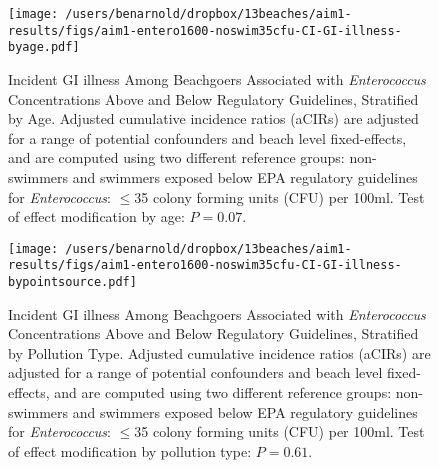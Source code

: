 \documentclass[12pt]{article}\usepackage[]{graphicx}\usepackage[]{color}
\begin{document}
\begin{landscape}
\begin{figure}[htbp]
\begin{center}
\texttt{[image: /users/benarnold/dropbox/13beaches/aim1-results/figs/aim1-entero1600-noswim35cfu-CI-GI-illness-byage.pdf]}
\begin{minipage}{1.2\textwidth}
\caption{Incident GI illness Among Beachgoers Associated with \textit{Enterococcus} Concentrations Above and Below Regulatory Guidelines, Stratified by Age. Adjusted cumulative incidence ratios (aCIRs) are adjusted for a range of potential confounders and beach level fixed-effects, and are computed using two different reference groups: non-swimmers and swimmers exposed below EPA regulatory guidelines for \textit{Enterococcus}: $\leq$35 colony forming units (CFU) per 100ml. Test of effect modification by age: $P=0.07$.}
\label{fig:GIentero35age}
\end{minipage}
\end{center}
\end{figure}
\end{landscape}

\begin{figure}[htbp]
\begin{center}
\texttt{[image: /users/benarnold/dropbox/13beaches/aim1-results/figs/aim1-entero1600-noswim35cfu-CI-GI-illness-bypointsource.pdf]}
\begin{minipage}{1\textwidth}
\caption{Incident GI illness Among Beachgoers Associated with \textit{Enterococcus} Concentrations Above and Below Regulatory Guidelines, Stratified by Pollution Type. Adjusted cumulative incidence ratios (aCIRs) are adjusted for a range of potential confounders and beach level fixed-effects, and are computed using two different reference groups: non-swimmers and swimmers exposed below EPA regulatory guidelines for \textit{Enterococcus}: $\leq$35 colony forming units (CFU) per 100ml. Test of effect modification by pollution type: $P=0.61$.}
\label{fig:GIentero35pol}
\end{minipage}
\end{center}
\end{figure}
\end{document}
